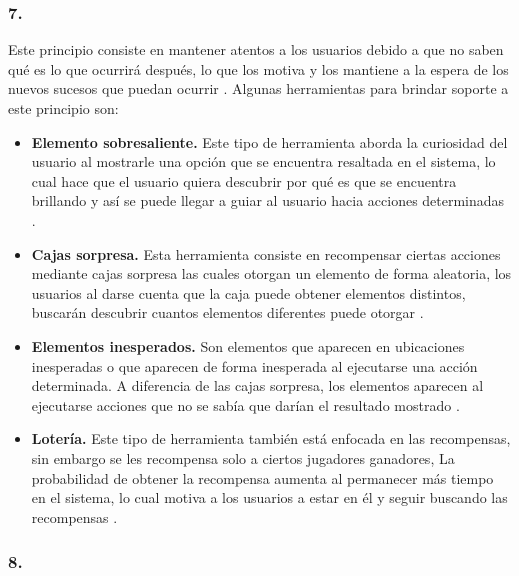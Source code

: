 \subsubsection{7. \principioVII}
\label{subsec:principioVII}

 Este principio consiste en mantener atentos a los usuarios debido a que no saben qué
 es lo que ocurrirá después, lo que los motiva y los mantiene a la espera de los
 nuevos sucesos que puedan ocurrir \cite[pp. 27, 273]{Octalysis}. Algunas
 herramientas para brindar soporte a este principio son:

    \begin{itemize}
    \item
    {\bf Elemento sobresaliente.} %
        Este tipo de herramienta aborda la curiosidad del usuario al mostrarle
        una opción que se encuentra resaltada en el sistema, lo cual hace que
        el usuario quiera descubrir por qué es que se encuentra brillando y así
        se puede llegar a guiar al usuario hacia acciones determinadas
        \cite[p. 297]{Octalysis}.

    \item
    {\bf Cajas sorpresa.}
        Esta herramienta consiste en recompensar ciertas acciones mediante cajas sorpresa
        las cuales otorgan un elemento de forma aleatoria, los usuarios al darse cuenta que
        la caja puede obtener elementos distintos, buscarán descubrir cuantos elementos diferentes
        puede otorgar \cite[p. 299]{Octalysis}.

    \item
    {\bf Elementos inesperados.} %
        Son elementos que aparecen en ubicaciones inesperadas o que aparecen de forma inesperada
        al ejecutarse una acción determinada. A diferencia de las cajas sorpresa, los elementos
        aparecen al ejecutarse acciones que no se sabía que darían el resultado mostrado
        \cite[p. 301]{Octalysis}.

    \item
    {\bf Lotería.}
        Este tipo de herramienta también está enfocada en las recompensas, sin embargo se les
        recompensa solo a ciertos jugadores ganadores, La probabilidad de obtener la recompensa
        aumenta al permanecer más tiempo en el sistema, lo cual motiva a los usuarios
        a estar en él y seguir buscando las recompensas \cite[p. 305]{Octalysis}.
    \end{itemize}

\clearpage
\subsubsection{8. \principioVIII} \label{subsec:principioVIII}

